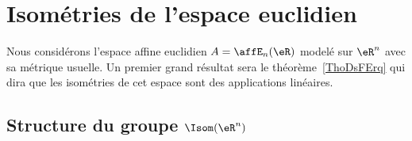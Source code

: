 
\section{Isométries de l'espace euclidien}

Nous considérons l'espace affine euclidien \( A=\affE_n(\eR)\) modelé sur \( \eR^n\) avec sa métrique usuelle. Un premier grand résultat sera le théorème~\ref{ThoDsFErq} qui dira que les isométries de cet espace sont des applications linéaires.

\subsection{Structure du groupe  \texorpdfstring{\( \Isom(\eR^n)\)}{Isom(Rn)} }

